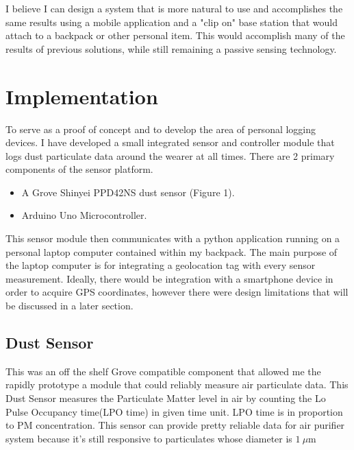 \documentclass{sigchi}
\begin{document}
I believe I can design a system that is more natural to use and accomplishes
the same results using a mobile application and a "clip on" base station that
would attach to a backpack or other personal item. This would accomplish many of
the results of previous solutions, while still remaining a passive sensing
technology.


\section{Implementation}

To serve as a proof of concept and to develop the area of personal logging
devices. I have developed a small integrated sensor and controller module that
logs dust particulate data around the wearer at all times. There are 2 primary
components of the sensor platform.

\begin{itemize}
\item A Grove Shinyei PPD42NS dust sensor (Figure 1).
\item Arduino Uno Microcontroller.
\end{itemize}

This sensor module then communicates with a python application running on a
personal laptop computer contained within my backpack. The main purpose of the
laptop computer is for integrating a geolocation tag with every sensor
measurement. Ideally, there would be integration with a smartphone device in order
to acquire GPS coordinates, however there were design limitations that will be
discussed in a later section.

\subsection{Dust Sensor}

This was an off the shelf Grove compatible component that allowed me the rapidly
prototype a module that could reliably measure air particulate data. This Dust
Sensor measures the Particulate Matter level in air by counting the Lo Pulse Occupancy
time(LPO time) in given time unit. LPO time is in proportion to PM concentration.
This sensor can provide pretty reliable data for air purifier system because
it's still responsive to particulates whose diameter is \( 1\ \mu \)m
\end{document}
